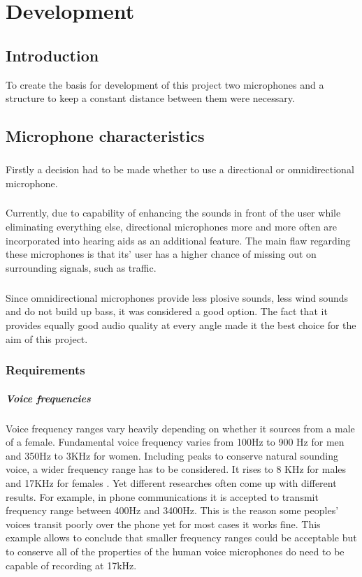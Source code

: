 \chapter{Development}\label{ch:development}
\section{Introduction}
To create the basis for development of this project two microphones and a structure to keep a constant distance between them were necessary.  

\section{Microphone characteristics}
\paragraph{}
Firstly a decision had to be made whether to use a directional or omnidirectional microphone. 
\paragraph{} Currently, due to capability of enhancing the sounds in front of the user while eliminating everything else, directional microphones more and more often are incorporated into hearing aids as an additional feature. The main flaw regarding these microphones is that its' user has a higher chance of missing out on surrounding signals, such as traffic. 
\paragraph{} Since omnidirectional microphones provide less plosive sounds, less wind sounds and do not build up bass, it was considered a good option. The fact that it provides equally good audio quality at every angle made it the best choice for the aim of this project.
\subsection{Requirements}
\paragraph{Voice frequencies\\} Voice frequency ranges vary heavily depending on whether it sources from a male of a female. Fundamental voice frequency varies from 100Hz to 900 Hz for men and 350Hz to 3KHz for women. Including peaks to conserve natural sounding voice, a wider frequency range has to be considered. It rises to 8 KHz for males and 17KHz for females \cite{Seaindia}. Yet different researches often come up with different results. For example, in phone communications it is accepted to transmit frequency range between 400Hz and 3400Hz. This is the reason some peoples' voices transit poorly over the phone yet for most cases it works fine. This example allows to conclude that smaller frequency ranges could be acceptable but to conserve all of the properties of the human voice microphones do need to be capable of recording at 17kHz. 
